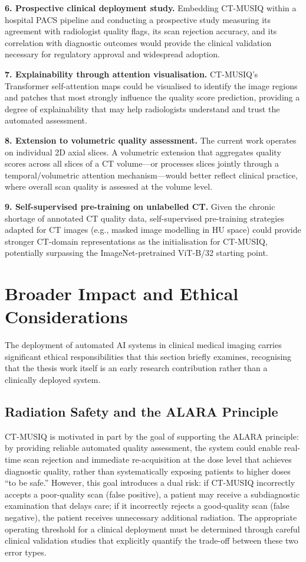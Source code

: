 \textbf{6. Prospective clinical deployment study.} Embedding CT-MUSIQ within a hospital
PACS pipeline and conducting a prospective study measuring its agreement with
radiologist quality flags, its scan rejection accuracy, and its correlation with
diagnostic outcomes would provide the clinical validation necessary for regulatory
approval and widespread adoption.

\textbf{7. Explainability through attention visualisation.} CT-MUSIQ's Transformer
self-attention maps could be visualised to identify the image regions and patches that
most strongly influence the quality score prediction, providing a degree of explainability
that may help radiologists understand and trust the automated assessment.

\textbf{8. Extension to volumetric quality assessment.} The current work operates on
individual 2D axial slices. A volumetric extension that aggregates quality scores across
all slices of a CT volume---or processes slices jointly through a temporal/volumetric
attention mechanism---would better reflect clinical practice, where overall scan quality
is assessed at the volume level.

\textbf{9. Self-supervised pre-training on unlabelled CT.} Given the chronic shortage
of annotated CT quality data, self-supervised pre-training strategies adapted for CT
images (e.g., masked image modelling in HU space) could provide stronger CT-domain
representations as the initialisation for CT-MUSIQ, potentially surpassing the
ImageNet-pretrained ViT-B/32 starting point.


\section{Broader Impact and Ethical Considerations}
\label{sec:conc_ethics}

The deployment of automated AI systems in clinical medical imaging carries significant
ethical responsibilities that this section briefly examines, recognising that the thesis
work itself is an early research contribution rather than a clinically deployed system.

\subsection{Radiation Safety and the ALARA Principle}

CT-MUSIQ is motivated in part by the goal of supporting the ALARA principle: by providing
reliable automated quality assessment, the system could enable real-time scan rejection
and immediate re-acquisition at the dose level that achieves diagnostic quality, rather
than systematically exposing patients to higher doses ``to be safe.'' However, this
goal introduces a dual risk: if CT-MUSIQ incorrectly accepts a poor-quality scan
(false positive), a patient may receive a subdiagnostic examination that delays care;
if it incorrectly rejects a good-quality scan (false negative), the patient receives
unnecessary additional radiation. The appropriate operating threshold for a clinical
deployment must be determined through careful clinical validation studies that explicitly
quantify the trade-off between these two error types.

